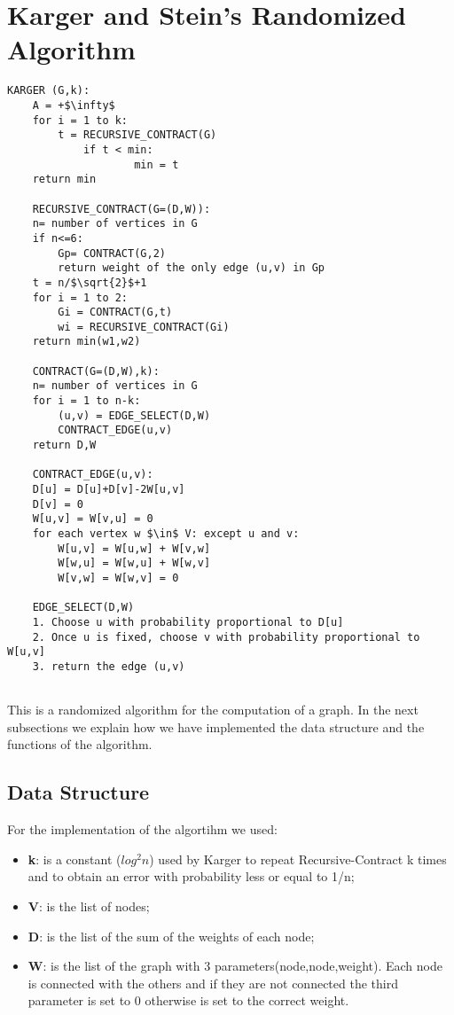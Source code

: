 \section{Karger and Stein's Randomized Algorithm}\label{karger}

\begin{lstlisting}[mathescape=true]
	KARGER (G,k):
	A = +$\infty$
	for i = 1 to k:		
		t = RECURSIVE_CONTRACT(G)		
			if t < min:
					min = t
	return min
	
	RECURSIVE_CONTRACT(G=(D,W)):
	n= number of vertices in G
	if n<=6:
		Gp= CONTRACT(G,2)
		return weight of the only edge (u,v) in Gp
	t = n/$\sqrt{2}$+1
	for i = 1 to 2:
		Gi = CONTRACT(G,t)
		wi = RECURSIVE_CONTRACT(Gi)
	return min(w1,w2)
	
	CONTRACT(G=(D,W),k):
	n= number of vertices in G
	for i = 1 to n-k:
		(u,v) = EDGE_SELECT(D,W)
		CONTRACT_EDGE(u,v)
	return D,W
	
	CONTRACT_EDGE(u,v):
	D[u] = D[u]+D[v]-2W[u,v]
	D[v] = 0
	W[u,v] = W[v,u] = 0
	for each vertex w $\in$ V: except u and v:
		W[u,v] = W[u,w] + W[v,w]
		W[w,u] = W[w,u] + W[w,v]
		W[v,w] = W[w,v] = 0
		
	EDGE_SELECT(D,W)
	1. Choose u with probability proportional to D[u]
	2. Once u is fixed, choose v with probability proportional to W[u,v]
	3. return the edge (u,v)
	
\end{lstlisting}

This is a randomized algorithm for the computation of a graph.
In the next subsections we explain how we have implemented the data structure and the functions of the algorithm.

\pagebreak

\subsection{Data Structure}
For the implementation of the algortihm we used:
\begin{itemize}
	\item  \textbf{k}: is a constant ($log^2n$) used by Karger to repeat Recursive-Contract k times and to obtain an error with probability less or equal to 1/n;
	\item  \textbf{V}: is the list of nodes;
	\item  \textbf{D}: is the list of the sum of the weights of each node;
	\item  \textbf{W}: is the list of the graph with 3 parameters(node,node,weight). Each node is connected with the others and if they are not connected the third parameter is set to 0 otherwise is set to the correct weight.
\end{itemize}


